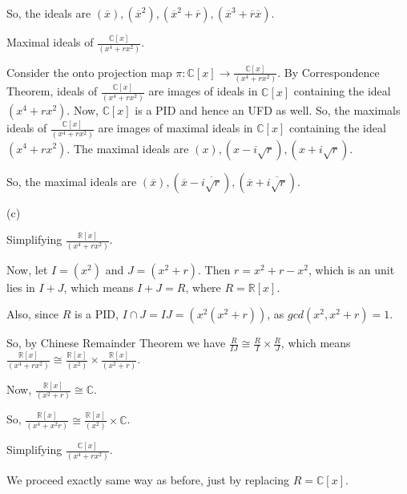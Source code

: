 \documentclass[12pt,a4paper]{article}
\theoremstyle{definition}
\begin{document}
\begin{flushleft}
\medskip

So, the ideals are $(\overline{x}), (\overline{x}^2), (\overline{x}^2 +\overline{r}), (\overline{x}^3 + \overline{r}\overline{x})$.

\bigskip

Maximal ideals of $\frac{\mathbb{C}[x]}{(x^4 + rx^2)}$.

\medskip

Consider the onto projection map $\pi:\mathbb{C}[x] \to \frac{\mathbb{C}[x]}{(x^4 + rx^2)}$. By Correspondence Theorem, ideals of $\frac{\mathbb{C}[x]}{(x^4 + rx^2)}$ are images of ideals in $\mathbb{C}[x]$ containing the ideal $(x^4 + rx^2)$. Now, $\mathbb{C}[x]$ is a PID and hence an UFD as well. So, the maximals ideals of $\frac{\mathbb{C}[x]}{(x^4 + rx^2)}$ are images of maximal ideals in $\mathbb{C}[x]$ containing the ideal $(x^4 + rx^2)$. The maximal ideals are $(x), (x-i\sqrt{r}), (x+i\sqrt{r}) $.

\medskip

So, the maximal ideals are $(\overline{x}), (\overline{x}-\overline{i\sqrt{r}}), (\overline{x}+\overline{i\sqrt{r}})$.

\newpage

(c)
\medskip

Simplifying $\frac{\mathbb{R}[x]}{(x^4 + rx^2)}$.

\medskip

Now, let $I = (x^2)$ and $J = (x^2 +r)$. Then $r = x^2 + r -x^2$, which is an unit lies in $I+J$, which means $I+J = R$, where $R = \mathbb{R}[x]$.

\medskip

Also, since $R$ is a PID, $I \cap J = IJ = (x^2(x^2+r))$, as $gcd(x^2,x^2 + r) = 1$.

So, by Chinese Remainder Theorem we have $\frac{R}{IJ} \cong \frac{R}{I} \times \frac{R}{J}$, which means $\frac{\mathbb{R}[x]}{(x^4 + rx^2)} \cong \frac{\mathbb{R}[x]}{(x^2)} \times \frac{\mathbb{R}[x]}{(x^2+r)}$.

Now, $\frac{\mathbb{R}[x]}{(x^2+r)} \cong \mathbb{C}$.

\medskip

So, $\frac{\mathbb{R}[x]}{(x^4 + x^2r)} \cong \frac{\mathbb{R}[x]}{(x^2)} \times \mathbb{C}$.

\bigskip

Simplifying $\frac{\mathbb{C}[x]}{(x^4 + rx^2)}$.

\medskip

We proceed exactly same way as before, just by replacing $R = \mathbb{C}[x]$.


\end{flushleft}
\end{document}
